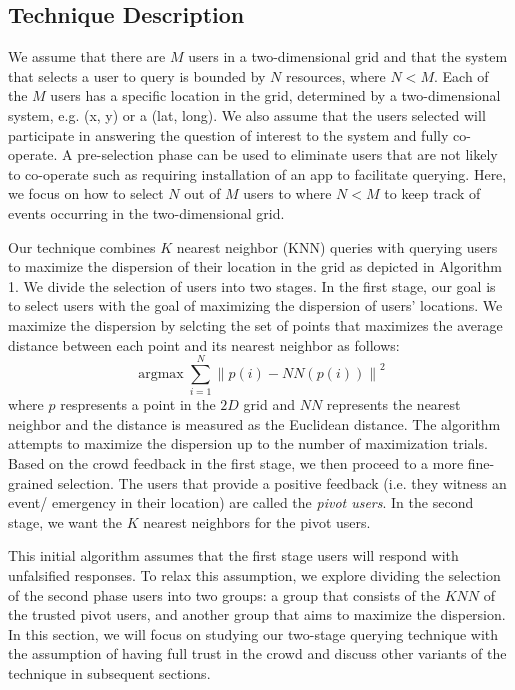 \documentclass{acm_proc_article-sp}
\DeclareMathOperator*{\argmax}{argmax}
\newcommand{\norm}[1]{\left\lVert #1 \right\rVert}
\begin{document}
\subsection{Technique Description}
We assume that there are $M$ users in a two-dimensional grid and that the system that selects a user to query is bounded by $N$ resources, where $N < M$.  Each of the $M$ users has a specific location in the grid, determined by a two-dimensional system, e.g. (x, y) or a (lat, long). We also assume that the users selected will participate in answering the question of interest to the system and fully co-operate. A pre-selection phase can be used to eliminate users that are not likely to co-operate such as requiring installation of an app to facilitate querying. Here, we focus on how to select $N$ out of $M$ users to  where $N < M$ to keep track of events occurring in the two-dimensional grid.\par
Our technique combines $K$ nearest neighbor (KNN) queries with querying users to maximize the dispersion of their location in the grid as depicted in Algorithm 1. We divide the selection of users into two stages. In the first stage, our goal is to select users with the goal of maximizing the dispersion of users' locations. We maximize the dispersion by selcting the set of points that maximizes the average distance between each point and its nearest neighbor as follows:
\begin{equation} \label{eq:maxDisp}
\argmax \sum_{i=1}^{N} \norm{p(i) - NN(p(i))}^2
\end{equation}
where $p$ respresents a point in the $2D$ grid and $NN$ represents the nearest neighbor and the distance is measured as the Euclidean distance. The algorithm attempts to maximize the dispersion up to the number of maximization trials. 
Based on the crowd feedback in the first stage, we then proceed to a more fine-grained selection. The users that provide a positive feedback (i.e. they witness an event/ emergency in their location) are called the \textit{pivot users}. In the second stage, we want the $K$ nearest neighbors for the pivot users. \par
This initial algorithm assumes that the first stage users will respond with unfalsified responses. To relax this assumption, we explore dividing the selection of the second phase users into two groups: a group that consists of the $KNN$ of the trusted pivot users, and another group that aims to maximize the dispersion. In this section, we will focus on studying our two-stage querying technique with the assumption of having full trust in the crowd and discuss other variants of the technique in subsequent sections.\par
\end{document}
